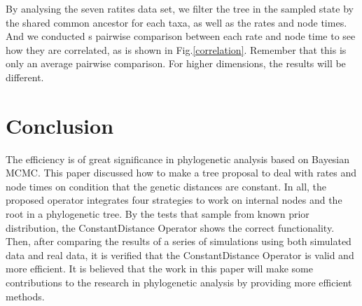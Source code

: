 \documentclass{bmcart}
\begin{document}
By analysing the seven ratites data set, we filter the tree in the sampled state by the shared common ancestor for each taxa, as well as the rates and node times. And we conducted s pairwise comparison between each rate and node time to see how they are correlated, as is shown in Fig.\ref{correlation}. Remember that this is only an average pairwise comparison. For higher dimensions, the results will be different. 

\section*{Conclusion}
The efficiency is of great significance in phylogenetic analysis based on Bayesian MCMC. This paper discussed how to make a tree proposal to deal with rates and node times on condition that the genetic distances are constant. In all, the proposed operator integrates four strategies to work on internal nodes and the root in a phylogenetic tree. By the tests that sample from known prior distribution, the ConstantDistance Operator shows the correct functionality. Then, after comparing the results of a series of simulations using both simulated data and real data, it is verified that the ConstantDistance Operator is valid and more efficient. It is believed that the work in this paper will make some contributions to the research in phylogenetic analysis by providing more efficient methods.
\end{document}
